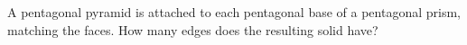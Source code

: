 A pentagonal pyramid is attached to each pentagonal base of a pentagonal prism, matching the faces. How many edges does the resulting solid have?
